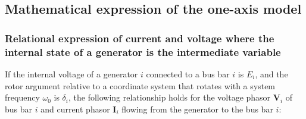 \documentclass[graybox, envcountchap]{svmult}
\begin{document}
\subsection{Mathematical expression of the one-axis model}\label{sec:genfund}
\smallskip
\subsubsection{Relational expression of current and voltage where the internal
state of a generator is the intermediate variable}

If the internal voltage of a generator $i$ connected to a bus bar $i$ is $E_i$, and the rotor argument relative to a coordinate system that rotates with a system frequency $\omega_0$ is $\delta_i$, the following relationship holds for the voltage phasor $\bm{V}_i$ of bus bar $i$ and current phasor $\bm{I}_i$ flowing from the generator to the bus bar $i$:
\end{document}
